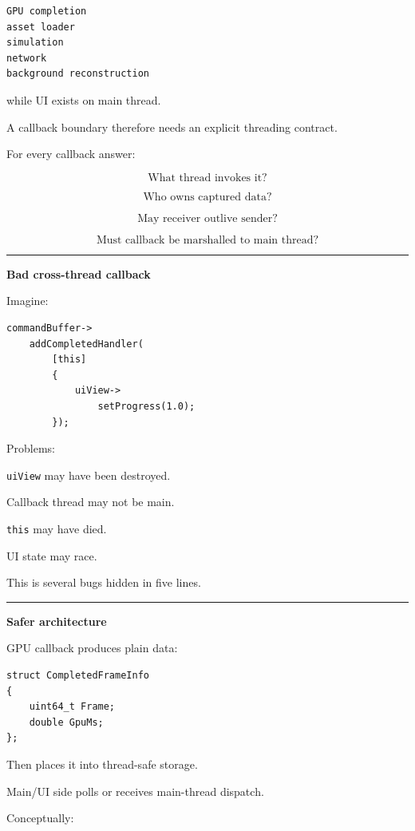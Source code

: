 \begin{verbatim}
GPU completion
asset loader
simulation
network
background reconstruction
\end{verbatim}

while UI exists on main thread.

A callback boundary therefore needs an explicit threading contract.

For every callback answer:

\[
\boxed{
\text{What thread invokes it?}
}
\]

\[
\boxed{
\text{Who owns captured data?}
}
\]

\[
\boxed{
\text{May receiver outlive sender?}
}
\]

\[
\boxed{
\text{Must callback be marshalled to main thread?}
}
\]

\begin{center}\rule{0.5\linewidth}{0.5pt}\end{center}

\textbf{Bad cross-thread callback}

Imagine:

\begin{verbatim}
commandBuffer->
    addCompletedHandler(
        [this]
        {
            uiView->
                setProgress(1.0);
        });
\end{verbatim}

Problems:

\texttt{uiView} may have been destroyed.

Callback thread may not be main.

\texttt{this} may have died.

UI state may race.

This is several bugs hidden in five lines.

\begin{center}\rule{0.5\linewidth}{0.5pt}\end{center}

\textbf{Safer architecture}

GPU callback produces plain data:

\begin{verbatim}
struct CompletedFrameInfo
{
    uint64_t Frame;
    double GpuMs;
};
\end{verbatim}

Then places it into thread-safe storage.

Main/UI side polls or receives main-thread dispatch.

Conceptually:

